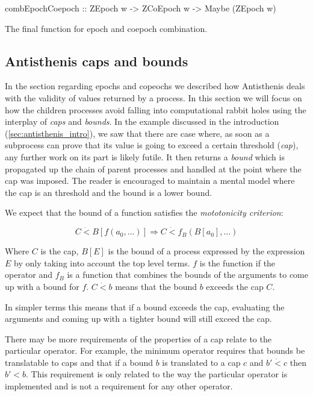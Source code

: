 \begin{code}
\begin{haskellcode}
combEpochCoepoch :: ZEpoch w -> ZCoEpoch w -> Maybe (ZEpoch w)
\end{haskellcode}
  \caption{\label{lst:comb_epoch_coepoch}The final function for epoch
    and coepoch combination.}
\end{code}

\subsection{Antisthenis caps and bounds}
\label{sec:caps_and_bounds}

In the section regarding epochs and copeochs we described how
Antisthenis deals with the validity of values returned by a
process. In this section we will focus on how the children processes
avoid falling into computational rabbit holes using the interplay of
\emph{caps} and \emph{bounds}.  In the example discussed in the
introduction (\ref{sec:antisthenis_intro}), we saw that there are case
where, as soon as a subprocess can prove that its value is going to
exceed a certain threshold (\emph{cap}), any further work on its part
is likely futile. It then returns a \emph{bound} which is propagated
up the chain of parent processes and handled at the point where the
cap was imposed. The reader is encouraged to maintain a mental model
where the cap is an threshold and the bound is a lower bound.

We expect that the bound of a function satisfies the
\emph{mototonicity criterion}:

\[
C \dot{<} B[ f(a_0, ...)] \Rightarrow C \dot{<} f_B(B[a_0],...)
\]

Where \(C\) is the cap, \(B[E]\) is the bound of a process expressed
by the expression \(E\) by only taking into account the top level
terms. \(f\) is the function if the operator and \(f_B\) is a function
that combines the bounds of the arguments to come up with a bound for
\(f\). \(C \dot{<} b\) means that the bound \(b\) exceeds the cap
\(C\).

In simpler terms this means that if a bound exceeds the cap,
evaluating the arguments and coming up with a tighter bound will still
exceed the cap.

There may be more requirements of the properties of a cap relate to
the particular operator. For example, the minimum operator requires
that bounds be translatable to caps and that if a bound \(b\) is
translated to a cap \(c\) and \(b' \dot{<} c\) then \(b' < b\). This
requirement is only related to the way the particular operator is
implemented and is not a requirement for any other operator.


